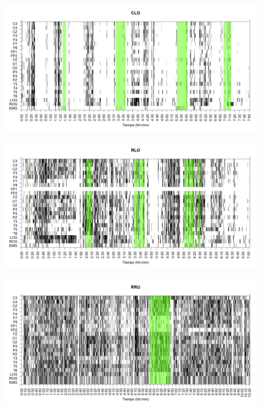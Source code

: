 
\begin{SidewaysFigure}
\centering
\includegraphics[width=\linewidth]
{./grafiquitos170404/CLMN10SUE_est.png} 
\caption{Sujeto: CLO | Total \'epocas: 944 | \'Epocas MOR: 132
}
\label{CLO}
\end{SidewaysFigure}


\begin{SidewaysFigure}
\centering
\includegraphics[width=\linewidth]
{./grafiquitos170404/RLMN10SUE_est.png} 
\caption{Sujeto: RLO | Total \'epocas: 846 | \'Epocas MOR: 99
}
\label{RLO}
\end{SidewaysFigure}


\begin{SidewaysFigure}
\centering
\includegraphics[width=\linewidth]
{./grafiquitos170404/RRMNS_est.png} 
\caption{Sujeto: RRU | Total \'epocas: 1244 | \'Epocas MOR: 114
}
\label{RRU}
\end{SidewaysFigure}

